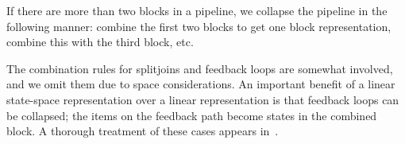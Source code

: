     If there are more than two blocks in a pipeline, we collapse
the pipeline in the following manner: combine the first two blocks
to get one block representation, combine this with the third
block, etc.


The combination rules for splitjoins and feedback loops are somewhat
involved, and we omit them due to space considerations.  An important
benefit of a linear state-space representation over a linear
representation is that feedback loops can be collapsed; the items on
the feedback path become states in the combined block.  A thorough
treatment of these cases appears in~\cite{Agrawal04}.





